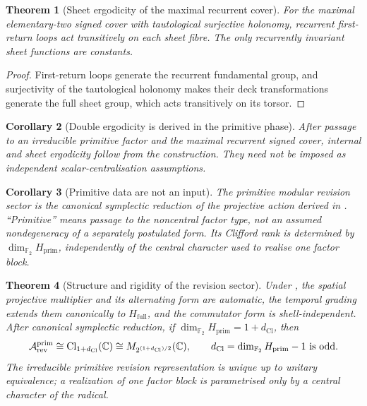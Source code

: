\documentclass[11pt]{article}
\newtheorem{theorem}{Theorem}[section]
\newtheorem{corollary}[theorem]{Corollary}
\theoremstyle{definition}
\theoremstyle{remark}
\newcommand{\C}{\mathbb{C}}
\newcommand{\F}{\mathbb{F}}
\newcommand{\Arev}{\mathcal{A}_{\mathrm{rev}}}
\newcommand{\Hf}{H_{\mathrm{full}}}
\newcommand{\Cl}{\mathrm{Cl}}
\newcommand{\dCl}{d_{\mathrm{Cl}}}
\newcommand{\Hprim}{H_{\mathrm{prim}}}
\begin{document}
\begin{theorem}[Sheet ergodicity of the maximal recurrent cover]
\label{thm:sheet-ergodicity-main}
For the maximal elementary-two signed cover with tautological surjective
holonomy, recurrent first-return loops act transitively on each sheet fibre.
The only recurrently invariant sheet functions are constants.
\end{theorem}

\begin{proof}
First-return loops generate the recurrent fundamental group, and surjectivity of
the tautological holonomy makes their deck transformations generate the full
sheet group, which acts transitively on its torsor.
\end{proof}

\begin{corollary}[Double ergodicity is derived in the primitive phase]
\label{cor:double-ergodicity-derived}
After passage to an irreducible primitive factor and the maximal recurrent
signed cover, internal and sheet ergodicity follow from the construction.  They
need not be imposed as independent scalar-centralisation assumptions.
\end{corollary}


\begin{corollary}[Primitive data are not an input]
\label{cor:primitive-not-input}
The primitive modular revision sector is the canonical symplectic reduction of
the projective action derived in .  ``Primitive'' means passage to the noncentral
factor type, not an assumed nondegeneracy of a separately postulated form.  Its
Clifford rank is determined by \(\dim_{\F_2}\Hprim\), independently of the
central character used to realise one factor block.
\end{corollary}

\begin{theorem}[Structure and rigidity of the revision sector]
\label{thm:revision-structure-main}
Under , the spatial projective multiplier and
its alternating form are automatic, the temporal grading extends them
canonically to \(\Hf\), and the commutator form is shell-independent.  After
canonical symplectic reduction, if
\(\dim_{\F_2}\Hprim=1+\dCl\), then
\[
  \Arev^{\rm prim}\cong\Cl_{1+\dCl}(\C)
  \cong M_{2^{(1+\dCl)/2}}(\C),
  \qquad
  \dCl=\dim_{\F_2}\Hprim-1\ \text{is odd}.
\]
The irreducible primitive revision representation is unique up to unitary
equivalence; a realization of one factor block is parametrised only by a
central character of the radical.
\end{theorem}
\end{document}
